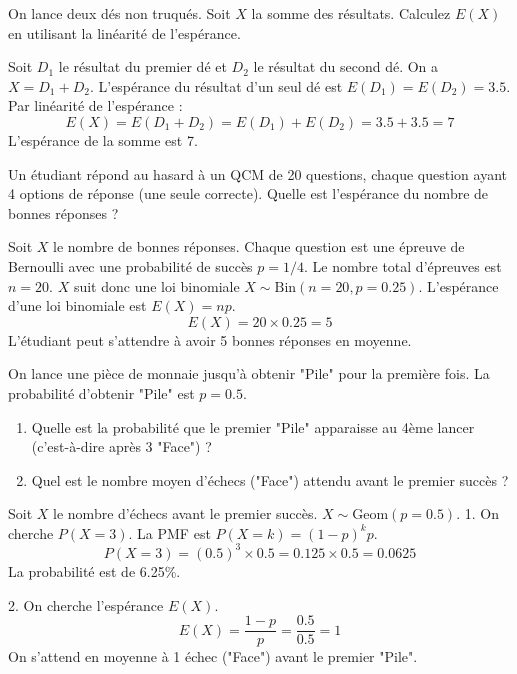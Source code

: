 \begin{exercicebox}
On lance deux dés non truqués. Soit $X$ la somme des résultats. Calculez $E(X)$ en utilisant la linéarité de l'espérance.
\end{exercicebox}

\begin{correctionbox}
Soit $D_1$ le résultat du premier dé et $D_2$ le résultat du second dé. On a $X = D_1 + D_2$.
L'espérance du résultat d'un seul dé est $E(D_1) = E(D_2) = 3.5$.
Par linéarité de l'espérance :
$$ E(X) = E(D_1 + D_2) = E(D_1) + E(D_2) = 3.5 + 3.5 = 7 $$
L'espérance de la somme est 7.
\end{correctionbox}

\begin{exercicebox}
Un étudiant répond au hasard à un QCM de 20 questions, chaque question ayant 4 options de réponse (une seule correcte). Quelle est l'espérance du nombre de bonnes réponses ?
\end{exercicebox}

\begin{correctionbox}
Soit $X$ le nombre de bonnes réponses. Chaque question est une épreuve de Bernoulli avec une probabilité de succès $p=1/4$. Le nombre total d'épreuves est $n=20$.
$X$ suit donc une loi binomiale $X \sim \text{Bin}(n=20, p=0.25)$.
L'espérance d'une loi binomiale est $E(X) = np$.
$$ E(X) = 20 \times 0.25 = 5 $$
L'étudiant peut s'attendre à avoir 5 bonnes réponses en moyenne.
\end{correctionbox}

\begin{exercicebox}
On lance une pièce de monnaie jusqu'à obtenir "Pile" pour la première fois. La probabilité d'obtenir "Pile" est $p=0.5$.
\begin{enumerate}
    \item Quelle est la probabilité que le premier "Pile" apparaisse au 4ème lancer (c'est-à-dire après 3 "Face") ?
    \item Quel est le nombre moyen d'échecs ("Face") attendu avant le premier succès ?
\end{enumerate}
\end{exercicebox}

\begin{correctionbox}
Soit $X$ le nombre d'échecs avant le premier succès. $X \sim \text{Geom}(p=0.5)$.
1. On cherche $P(X=3)$. La PMF est $P(X=k) = (1-p)^k p$.
$$ P(X=3) = (0.5)^3 \times 0.5 = 0.125 \times 0.5 = 0.0625 $$
La probabilité est de 6.25\%.

2. On cherche l'espérance $E(X)$.
$$ E(X) = \frac{1-p}{p} = \frac{0.5}{0.5} = 1 $$
On s'attend en moyenne à 1 échec ("Face") avant le premier "Pile".
\end{correctionbox}

